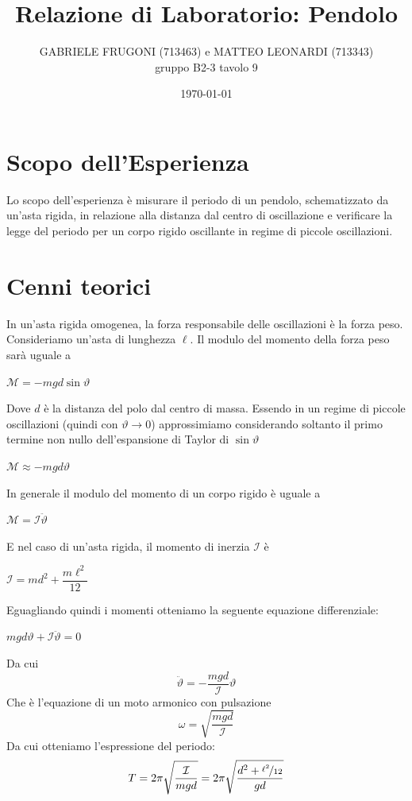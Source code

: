 \documentclass[a4paper,12pt]{article}
\title{Relazione di Laboratorio: Pendolo}
\author{GABRIELE FRUGONI (713463) e MATTEO LEONARDI (713343)\\ gruppo B2-3 tavolo 9}
\date{\today}
\begin{document}
\maketitle

\section{Scopo dell'Esperienza}
Lo scopo dell'esperienza è misurare il periodo di un pendolo, schematizzato da un'asta rigida, in relazione alla distanza dal centro di oscillazione e verificare la legge del periodo per un corpo rigido oscillante in regime di piccole oscillazioni.
\section{Cenni teorici}
In un'asta rigida omogenea, la forza responsabile delle oscillazioni è la forza peso. Consideriamo un'asta di lunghezza $\ell$. Il modulo del momento della forza peso sarà uguale a
\begin{center}
    $\mathcal M =- m g d \sin\vartheta$
\end{center}
Dove $d$ è la distanza del polo dal centro di massa. Essendo in un regime di piccole oscillazioni (quindi con $\vartheta\rightarrow0$) approssimiamo considerando soltanto il primo termine non nullo dell'espansione di Taylor di $\sin\vartheta$
\begin{center}
    $\mathcal M \approx -mgd\vartheta$
\end{center}
In generale il modulo del momento di un corpo rigido è uguale a
\begin{center}
    $\mathcal{M}=\mathcal{I} \ddot{\vartheta}$
\end{center}
E nel caso di un'asta rigida, il momento di inerzia $\mathcal I$ è 
\begin{center}
    $\mathcal I = md^2 + \dfrac{m\ell^2}{12}$
\end{center}
Eguagliando quindi i momenti otteniamo la seguente equazione differenziale:
\begin{center}
    $mgd\vartheta +\mathcal I \ddot{\vartheta}=0$
\end{center}
Da cui 
\begin{equation}
    \ddot \vartheta = -\dfrac{mgd}{\mathcal I}\vartheta\label{eq:diff_moto}
\end{equation}
Che è l'equazione di un moto armonico con pulsazione
\begin{equation}
    \omega=\sqrt{\dfrac{mgd}{\mathcal I}}\label{eq:omega}
\end{equation}
Da cui otteniamo l'espressione del periodo:
\begin{equation}
    T=2\pi\sqrt{\dfrac{\mathcal I}{mgd}}=2\pi\sqrt{\dfrac{d^2+\nicefrac{\ell^2}{12}}{gd}}
\label{eq:periodo_funz_distanza}
\end{equation}
\end{document}
